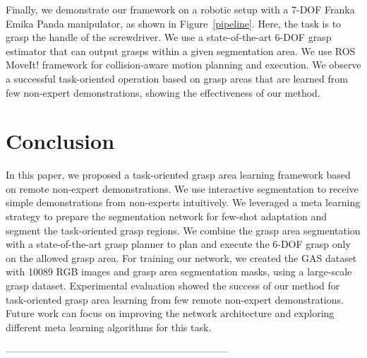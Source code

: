 \documentclass[letterpaper]{article} %
\begin{document}
Finally, we demonstrate our framework on a robotic setup with a 7-DOF Franka Emika Panda manipulator, as shown in Figure~\ref{pipeline}. Here, the task is to grasp the handle of the screwdriver. We use a state-of-the-art 6-DOF grasp estimator \cite{sundermeyer2021contact} that can output grasps within a given segmentation area. We use ROS MoveIt! framework \cite{coleman2014reducing} for collision-aware motion planning and execution. We observe a successful task-oriented operation based on grasp areas that are learned from few non-expert demonstrations, showing the effectiveness of our method.

\section{Conclusion}
\label{sec:conclusion}

In this paper, we proposed a task-oriented grasp area learning framework based on remote non-expert demonstrations. We use interactive segmentation to receive simple demonstrations from non-experts intuitively. We leveraged a meta learning strategy to prepare the segmentation network for few-shot adaptation and segment the task-oriented grasp regions. We combine the grasp area segmentation with a state-of-the-art grasp planner to plan and execute the 6-DOF grasp only on the allowed grasp area. For training our network, we created the GAS dataset with 10089 RGB images and grasp area segmentation masks, using a large-scale grasp dataset. Experimental evaluation showed the success of our method for task-oriented grasp area learning from few remote non-expert demonstrations. Future work can focus on improving the network architecture and exploring different meta learning algorithms for this task.

--------------------------------------------------------------------


\end{document}
